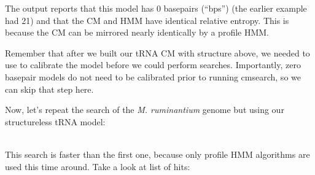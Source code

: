 The output reports that this model has 0 basepairs (``bps'') (the
earlier example had 21) and that the CM and HMM have identical
relative entropy. This is because the CM can be mirrored nearly
identically by a profile HMM.

Remember that after we built our tRNA CM with structure above, we
needed to use  to calibrate the model before we
could perform searches. Importantly, zero basepair models do not need
to be calibrated prior to running cmsearch, so we can skip that step
here. 

Now, let's repeat the search of the \emph{M. ruminantium} genome but
using our structureless tRNA model: 

\\

This search is faster than the first one, because only
profile HMM algorithms are used this time around. Take a look at list
of hits:

